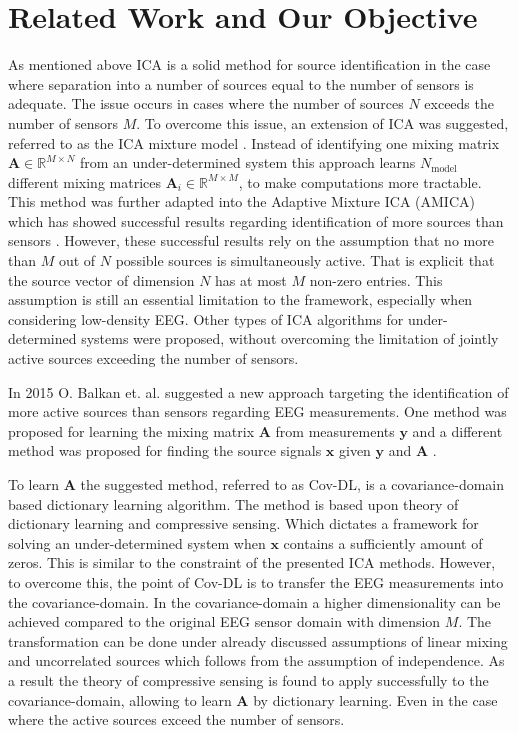 \section{Related Work and Our Objective}\label{sec:relatedwork}
As mentioned above ICA is a solid method for source identification in the case where separation into a number of sources equal to the number of sensors is adequate. The issue occurs in cases where the number of sources $N$ exceeds the number of sensors $M$. 
To overcome this issue, an extension of ICA was suggested, referred to as the ICA mixture model \cite{Balkan2015}.
Instead of identifying one mixing matrix $\mathbf{A} \in \mathbb{R}^{M \times N}$ from an under-determined system this approach learns $N_{\text{model}}$ different mixing matrices $\mathbf{A}_i \in \mathbb{R}^{M\times M}$, to make computations more tractable. 
This method was further adapted into the Adaptive Mixture ICA (AMICA) which has showed successful results regarding identification of more sources than sensors \cite{Palmer2008}. 
However, these successful results rely on the assumption that no more than $M$ out of $N$ possible sources is simultaneously active. That is explicit that the source vector of dimension $N$ has at most $M$ non-zero entries.
This assumption is still an essential limitation to the framework, especially when considering low-density EEG. 
Other types of ICA algorithms for under-determined systems were proposed, without overcoming the limitation of jointly active sources exceeding the number of sensors.

In 2015 O. Balkan et. al. suggested a new approach targeting the identification of more active sources than sensors regarding EEG measurements. One method was proposed for learning the mixing matrix $\mathbf{A}$ from measurements $\mathbf{y}$ \cite{Balkan2015} and a different method was proposed for finding the source signals $\mathbf{x}$ given $\mathbf{y}$ and $\mathbf{A}$ \cite{Balkan2014}.

To learn $\mathbf{A}$ the suggested method, referred to as Cov-DL, is a covariance-domain based dictionary learning algorithm. 
The method is based upon theory of dictionary learning and compressive sensing. Which dictates a framework for solving an under-determined system when $\mathbf{x}$ contains a sufficiently amount of zeros. 
This is similar to the constraint of the presented ICA methods. However, to overcome this, the point of Cov-DL is to transfer the EEG measurements into the covariance-domain. In the covariance-domain a higher dimensionality can be achieved compared to the original EEG sensor domain with dimension $M$.
The transformation can be done under already discussed assumptions of linear mixing and uncorrelated sources which follows from the assumption of independence.
As a result the theory of compressive sensing is found to apply successfully to the covariance-domain, allowing to learn $\mathbf{A}$ by dictionary learning. Even in the case where the active sources exceed the number of sensors.

